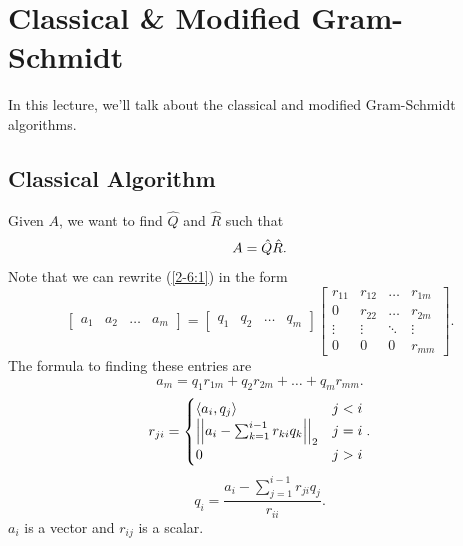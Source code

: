 \documentclass[letterpaper]{article}
\begin{document}
\section{Classical \& Modified Gram-Schmidt}
In this lecture, we'll talk about the classical and modified Gram-Schmidt algorithms. 

\subsection{Classical Algorithm}
Given $A$, we want to find $\hat{Q}$ and $\hat{R}$ such that 
\begin{equation}{\label{2-6:1}}
    A = \hat{Q}\hat{R}.
\end{equation} Note that we can rewrite ({\ref{2-6:1}}) in the form 
\[\begin{bmatrix}
    a_1 & a_2 & \hdots & a_m
\end{bmatrix} = \begin{bmatrix}
    q_1 & q_2 & \hdots & q_m
\end{bmatrix} \begin{bmatrix}
    r_{11} & r_{12} & \hdots & r_{1m} \\ 
    0      & r_{22} & \hdots & r_{2m} \\ 
    \vdots & \vdots & \ddots & \vdots \\ 
    0      & 0      & 0      & r_{mm} 
\end{bmatrix}.\] 
The formula to finding these entries are 
\[a_m = q_1 r_{1m} + q_2 r_{2m} + \hdots + q_m r_{mm}.\]
\[r_{ji} = \begin{cases}
    \langle a_{i}, q_{j} \rangle & j < i \\ 
    \left|\left| a_i - \sum_{k = 1}^{i - 1} r_{ki} q_k \right|\right|_2 & j = i \\ 
    0 & j > i
\end{cases}.\]
\[q_{i} = \frac{a_i - \sum_{j = 1}^{i - 1} r_{ji} q_j}{r_{ii}}.\]
$a_i$ is a vector and $r_{ij}$ is a scalar. 
\end{document}
